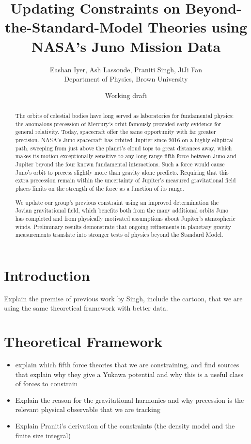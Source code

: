 \documentclass[11pt,a4paper]{article}
\title{Updating Constraints on Beyond-the-Standard-Model Theories using NASA's Juno Mission Data}
\author{Eashan Iyer, Ash Lassonde, Praniti Singh, JiJi Fan\\
\small Department of Physics, Brown University}
\date{Working draft}
\begin{document}
\maketitle

\begin{abstract}
The orbits of celestial bodies have long served as laboratories for fundamental physics: the anomalous precession of Mercury's orbit famously provided early evidence for general relativity. Today, spacecraft offer the same opportunity with far greater precision. NASA's Juno spacecraft has orbited Jupiter since 2016 on a highly elliptical path, sweeping from just above the planet's cloud tops to great distances away, which makes its motion exceptionally sensitive to any long-range fifth force between Juno and Jupiter beyond the four known fundamental interactions. Such a force would cause Juno's orbit to precess slightly more than gravity alone predicts. Requiring that this extra precession remain within the uncertainty of Jupiter's measured gravitational field places limits on the strength of the force as a function of its range.

We update our group's previous constraint using an improved determination the Jovian gravitational field, which benefits both from the many additional orbits Juno has completed and from physically motivated assumptions about Jupiter's atmospheric winds. Preliminary results demonstrate that ongoing refinements in planetary gravity measurements translate into stronger tests of physics beyond the Standard Model.
\end{abstract}

\tableofcontents
\newpage

\section{Introduction}
Explain the premise of previous work by Singh, include the cartoon, that we are using the same theoretical framework with better data. 


\section{Theoretical Framework}
\begin{itemize}
    \item explain which fifth force theories that we are constraining, and find sources that explain why they give a Yukawa potential and why this is a useful class of forces to constrain
    \item Explain the reason for the gravitational harmonics and why precession is the relevant physical observable that we are tracking
    \item Explain Praniti's derivation of the constraints  (the density model and the finite size integral)
\end{itemize}
\end{document}
